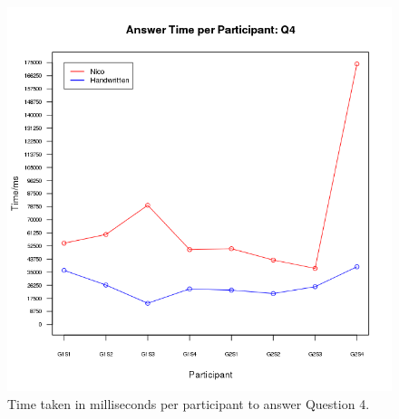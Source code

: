 \documentclass[12pt,twoside,notitlepage,xetex]{report}
\begin{document}
\begin{center}
\begin{figure}[H]
\begin{center}
\includegraphics[height=\textheight/2-2cm]{figs/graphs/q4.png}
\end{center}
\caption{Time taken in milliseconds per participant to answer Question 4.}
\end{figure}
\end{center}
\end{document}
